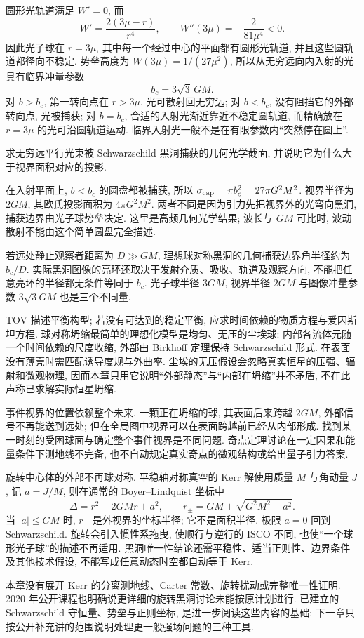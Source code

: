 圆形光轨道满足 $W'=0$, 而
\[
 W'=\frac{2(3\mu-r)}{r^4},\qquad W''(3\mu)=-\frac2{81\mu^4}<0.
\]
因此光子球在 $r=3\mu$, 其中每一个经过中心的平面都有圆形光轨道, 并且这些圆轨道都径向不稳定. 势垒高度为 $W(3\mu)=1/(27\mu^2)$, 所以从无穷远向内入射的光具有临界冲量参数
\begin{equation}
 b_c=3\sqrt3\,GM.
 \label{eq:gr-photon-critical}
\end{equation}
对 $b>b_c$, 第一转向点在 $r>3\mu$, 光可散射回无穷远; 对 $b<b_c$, 没有阻挡它的外部转向点, 光被捕获; 对 $b=b_c$, 合适的入射光渐近靠近不稳定圆轨道, 而精确放在 $r=3\mu$ 的光可沿圆轨道运动. 临界入射光一般不是在有限参数内“突然停在圆上”.

\begin{example}
 求无穷远平行光束被 Schwarzschild 黑洞捕获的几何光学截面, 并说明它为什么大于视界面积对应的投影.
\end{example}
\begin{solution}
 在入射平面上, $b<b_c$ 的圆盘都被捕获, 所以 $\sigma_{\rm cap}=\pi b_c^2=27\pi G^2M^2$. 视界半径为 $2GM$, 其欧氏投影面积为 $4\pi G^2M^2$. 两者不同是因为引力先把视界外的光弯向黑洞, 捕获边界由光子球势垒决定. 这里是高频几何光学结果; 波长与 $GM$ 可比时, 波动散射不能由这个简单圆盘完全描述.
\end{solution}

若远处静止观察者距离为 $D\gg GM$, 理想球对称黑洞的几何捕获边界角半径约为 $b_c/D$. 实际黑洞图像的亮环还取决于发射介质、吸收、轨道及观察方向, 不能把任意亮环的半径都无条件等同于 $b_c$. 光子球半径 $3GM$, 视界半径 $2GM$ 与图像冲量参数 $3\sqrt3 GM$ 也是三个不同量.


TOV 描述平衡构型; 若没有可达到的稳定平衡, 应求时间依赖的物质方程与爱因斯坦方程. 球对称坍缩最简单的理想化模型是均匀、无压的尘埃球: 内部各流体元随一个时间依赖的尺度收缩, 外部由 Birkhoff 定理保持 Schwarzschild 形式. 在表面没有薄壳时需匹配诱导度规与外曲率. 尘埃的无压假设会忽略真实恒星的压强、辐射和微观物理, 因而本章只用它说明“外部静态”与“内部在坍缩”并不矛盾, 不在此声称已求解实际恒星坍缩.

事件视界的位置依赖整个未来. 一颗正在坍缩的球, 其表面后来跨越 $2GM$, 外部信号不再能送到远处; 但在全局图中视界可以在表面跨越前已经从内部形成. 找到某一时刻的受困球面与确定整个事件视界是不同问题. 奇点定理讨论在一定因果和能量条件下测地线不完备, 也不自动规定真实奇点的微观结构或给出量子引力答案.

旋转中心体的外部不再球对称. 平稳轴对称真空的 Kerr 解使用质量 $M$ 与角动量 $J$, 记 $a=J/M$, 则在通常的 Boyer--Lindquist 坐标中
\[
 \Delta=r^2-2GM r+a^2,\qquad
 r_\pm=GM\pm\sqrt{G^2M^2-a^2}.
\]
当 $|a|\le GM$ 时, $r_+$ 是外视界的坐标半径; 它不是面积半径. 极限 $a=0$ 回到 Schwarzschild. 旋转会引入惯性系拖曳, 使顺行与逆行的 ISCO 不同, 也使“一个球形光子球”的描述不再适用. 黑洞唯一性结论还需平稳性、适当正则性、边界条件及其他技术假设, 不能写成任意动态时空都自动等于 Kerr.

本章没有展开 Kerr 的分离测地线、Carter 常数、旋转扰动或完整唯一性证明. 2020 年公开课程也明确说更详细的旋转黑洞讨论未能按原计划进行. 已建立的 Schwarzschild 守恒量、势垒与正则坐标, 是进一步阅读这些内容的基础; 下一章只按公开补充讲的范围说明处理更一般强场问题的三种工具.
